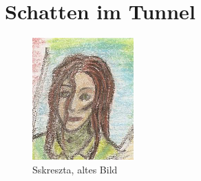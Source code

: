 \documentclass[11pt]{scrartcl}
\begin{document}
\section{Schatten im Tunnel}

\begin{figure}[htbp]
\centering
\includegraphics{sskreszta-portrait-alt-klein.png}
\caption{Sskreszta, altes Bild}
\end{figure}
\end{document}

